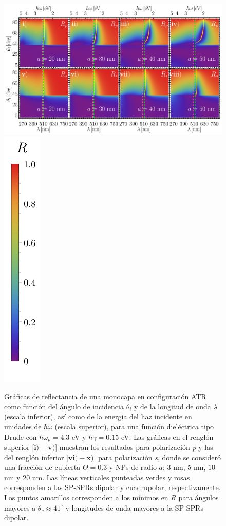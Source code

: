\begin{figure}[b!]\centering
\includegraphics[width = .76\linewidth]{2-Resultados/figs/8-AurVar/0-2D_Grid}%
\includegraphics[scale=.89, trim={00 -5 00 00}, clip]{2-Resultados/figs/0-RBar_v}\vspace*{-.5em}
	\caption{Gráficas de reflectancia de una monocapa en configuración ATR como función del ángulo de incidencia $\theta_i$ y de la longitud de onda $\lambda$ (escala inferior), así como de la energía del haz incidente en unidades de $\hbar\omega$ (escala superior), para una función dieléctrica tipo Drude con $\hbar\omega_p=4.3$ eV  y  $\hbar\gamma=0. 15$ eV.  Las gráficas   en el renglón superior [$\mathbf{i)-v)}$] muestran los resultados para  polarización \emph{p} y las del renglón inferior  [$\mathbf{vi)-x)}$]  para polarización  \emph{s}, donde se consideró una fracción de cubierta $\Theta = 0.3$ y  NPs de radio  $a$: $3$ nm, $5$ nm, $10$ nm y $20$ nm.  Las líneas verticales punteadas verdes y rosas corresponden a las SP-SPRs dipolar y  cuadrupolar, respectivamente.  Los puntos amarillos corresponden a los mínimos en $R$ para ángulos mayores a $\theta_c\approx 41^\circ$ y longitudes de onda mayores a la SP-SPRs dipolar.
}	\label{fig:Au-R-Rad}	
	\end{figure}	

